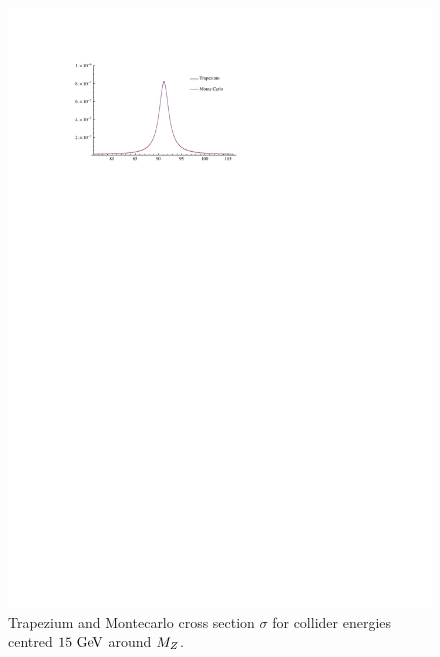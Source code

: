 \documentclass[]{article}
\begin{document}
\begin{figure}[H]
	\vspace{10pt}
	\hspace*{-0.1\textwidth}
	\centering
	\label{fig:bothcombinedfocused}
	\includegraphics[width=1.2\textwidth]{both_combined_focused}
	\caption{Trapezium and Montecarlo cross section $\sigma$ for collider energies centred $15\GeV$ around $M_{Z }$.}
	\label{fig:both}
\end{figure}
\end{document}
